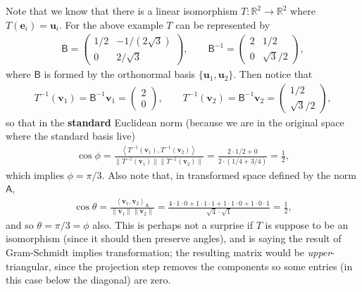 \documentclass[letter-paper]{tufte-book}
\newenvironment{example}[1][Example]{\begin{trivlist}
\item[\hskip \labelsep {\bfseries #1}]}{\end{trivlist}}
\newcommand{\inner}[2]{\left\langle #1, #2\right\rangle}
\newcommand{\As}{{\mathsf{A}}}
\newcommand{\Bs}{{\mathsf{B}}}
\newcommand{\eb}{{\boldsymbol{e}}}
\newcommand{\ub}{{\boldsymbol{u}}}
\newcommand{\vb}{{\boldsymbol{v}}}
\begin{document}
\begin{example}
  Note that we know that there is a linear isomorphism $T : \mathbb{R}^2 \to \mathbb{R}^2$ where $T(\eb_i) = \ub_i$. For the above example $T$ can be represented by
  \begin{align*}
    \Bs = \begin{pmatrix} 1/2 & -1/(2\sqrt{3}) \\ 0 & 2/\sqrt{3}\end{pmatrix}, \qquad \Bs^{-1} = \begin{pmatrix} 2 & 1/2 \\ 0 & \sqrt{3}/2\end{pmatrix},
  \end{align*}
  where $\Bs$ is formed by the orthonormal basis $\{\ub_1, \ub_2\}$. Then notice that
  \begin{align*}
    T^{-1}(\vb_1) = \Bs^{-1}\vb_1 = \begin{pmatrix} 2 \\ 0 \end{pmatrix}, \qquad
    T^{-1}(\vb_2) = \Bs^{-1}\vb_2 = \begin{pmatrix} 1/2 \\ \sqrt{3}/2 \end{pmatrix},
  \end{align*}
  so that in the \textbf{standard} Euclidean norm (because we are in the original space where the standard basis live)
  \begin{align*}
    \cos\phi = \frac{\inner{T^{-1}(\vb_1)}{T^{-1}(\vb_2)}}{\|T^{-1}(\vb_1)\|\|T^{-1}(\vb_2)\|} = \frac{2\cdot 1/2 + 0}{2 \cdot (1/4 + 3/4)} = \frac{1}{2},
  \end{align*}
  which implies $\phi = \pi / 3$. Also note that, in transformed space defined by the norm $\As$,
  \begin{align*}
    \cos\theta = \frac{\inner{\vb_1}{\vb_2}_\As}{\|\vb_1\|\|\vb_2\|} = \frac{4\cdot 1\cdot 0 + 1\cdot 1\cdot 1 + 1\cdot 1 \cdot 0 + 1\cdot 0 \cdot 1}{\sqrt{4} \cdot \sqrt{1}} = \frac{1}{2},
  \end{align*}
  and so $\theta = \pi/3 = \phi$ also. This is perhaps not a surprise if $T$ is suppose to be an isomorphism (since it should then preserve angles), and is saying the result of Gram-Schmidt implies transformation; the resulting matrix would be \emph{upper}-triangular, since the projection step removes the components so some entries (in this case below the diagonal) are zero.
\end{example}
\end{document}
